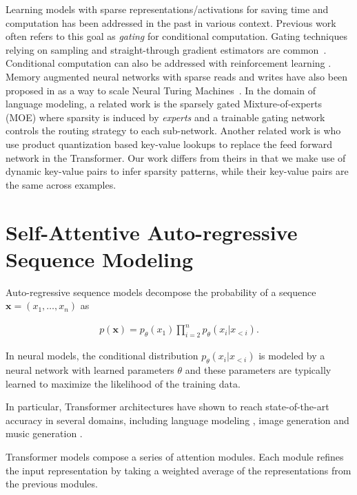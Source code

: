 Learning models with sparse representations/activations for saving time and computation has been addressed in the past in various context. Previous work often refers to this goal as
\emph{gating} for conditional computation. Gating techniques relying on sampling and straight-through gradient estimators are common~\citep{bengio2013estimating,eigen2013learning,cho2014exponentially}. Conditional computation can also be addressed with reinforcement learning 
\citep{denoyer2014deep, indurthi2019look}. Memory augmented neural networks with sparse reads and writes have also been proposed in \citet{rae2016scaling}
as a way to scale Neural Turing Machines~\citep{graves2014neural}. In the domain of language modeling, a related work is the sparsely gated Mixture-of-experts (MOE) \citep{shazeer2017outrageously} where sparsity is induced by \emph{experts} 
and a trainable gating network controls the routing strategy to each sub-network. Another related work is \citet{lample2019large} who use product quantization based key-value lookups to replace the feed forward network in the Transformer. Our work differs from theirs in that we make use of dynamic key-value pairs to infer sparsity patterns, while their key-value pairs are the same across examples.
\section{Self-Attentive Auto-regressive Sequence Modeling}
\label{sec:attention}

Auto-regressive sequence models decompose the probability of a sequence \(\mathbf{x} = \left(x_1, \dots, x_n\right)\) as

\begin{align}
    p(\mathbf{x}) = p_\theta(x_1) \prod_{i=2}^{n} p_\theta(x_{i} | x_{< i}).
\end{align}

In neural models, the conditional distribution 
\(p_\theta(x_{i} | x_{< i})\) 
is modeled by a neural network with learned parameters \(\theta\) and these parameters are typically learned to maximize the likelihood of the training data.

In particular, Transformer architectures have shown to reach state-of-the-art accuracy in several domains, including language modeling \citep{vaswani2017attention, radford2018improving}, image generation \citep{parmar2018image} and music generation \citep{huang2018music}. 

Transformer models compose a series of attention modules. Each module refines the input representation by taking a weighted average of the representations from the previous modules.

